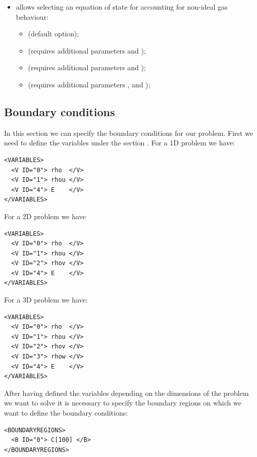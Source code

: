 \begin{itemize}
\item {} allows selecting an equation of state for
accounting for non-ideal gas behaviour:
\begin{itemize}
\item {} (default option);
\item {} (requires additional parameters  and );
\item {} (requires additional parameters  and );
\item {} (requires additional parameters ,  and
);
\end{itemize}
\end{itemize}

\subsection*{Boundary conditions}
In this section we can specify the boundary conditions for our problem.
First we need to define the variables under the section .
For a 1D problem we have:
\begin{lstlisting}[style=XmlStyle]
<VARIABLES>
  <V ID="0"> rho  </V>
  <V ID="1"> rhou </V>
  <V ID="4"> E    </V>
</VARIABLES>
\end{lstlisting}

For a 2D problem we have
\begin{lstlisting}[style=XmlStyle]
<VARIABLES>
  <V ID="0"> rho  </V>
  <V ID="1"> rhou </V>
  <V ID="2"> rhov </V>
  <V ID="4"> E    </V>
</VARIABLES>
\end{lstlisting}

For a 3D problem we have:
\begin{lstlisting}[style=XmlStyle]
<VARIABLES>
  <V ID="0"> rho  </V>
  <V ID="1"> rhou </V>
  <V ID="2"> rhov </V>
  <V ID="3"> rhow </V>
  <V ID="4"> E    </V>
</VARIABLES>
\end{lstlisting}

After having defined the variables depending on the dimensions of the problem we want to solve
it is necessary to specify the boundary regions on which we want to define the boundary conditions:
\begin{lstlisting}[style=XmlStyle]
<BOUNDARYREGIONS>
  <B ID="0"> C[100] </B>
</BOUNDARYREGIONS>
\end{lstlisting}

